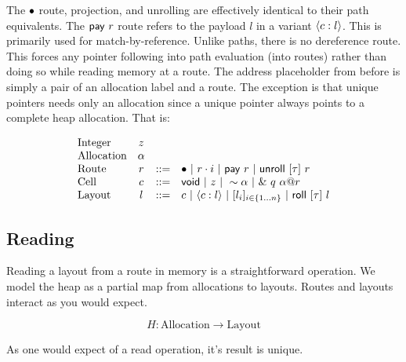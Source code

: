 The $\bullet$ route, projection, and unrolling are effectively identical to their path equivalents.
The $\mathsf{pay}~{r}$ route refers to the payload $l$ in a variant $\langle{{c}:{l}}\rangle$.
This is primarily used for match-by-reference.
Unlike paths, there is no dereference route.
This forces any pointer following into path evaluation (into routes)
rather than doing so while reading memory at a route.
The address placeholder from before is simply a pair of an allocation label and a route.
The exception is that unique pointers needs only an allocation since a unique pointer
always points to a complete heap allocation.
That is:

\[
\begin{array}{lccl}
\textrm{Integer} & z & & \\
\textrm{Allocation} & \alpha & & \\
\textrm{Route} & r & ::= & \bullet ~|~ {r}\cdot{i} ~|~ \mathsf{pay}~{r} ~|~ \mathsf{unroll}~[{\tau}]~{r} \\
\textrm{Cell} & c & ::= & \mathsf{void} ~|~ z ~|~ 
			      \sim{\alpha} ~|~ \&~{{q}~{{\alpha}@{r}}} \\
\textrm{Layout} & l & ::= & c ~|~ \langle{{c}:{l}}\rangle ~|~ 
			       [{{l}_{i}}]_{{i} \in \{1 \ldots {n}\} } ~|~ \mathsf{roll}~[{\tau}]~{l} \\
\end{array}
\]

\subsection*{Reading}

Reading a layout from a route in memory is a straightforward operation.
We model the heap as a partial map from allocations to layouts.
Routes and layouts interact as you would expect.

$$ H : \mathrm{Allocation} \to \mathrm{Layout} $$



As one would expect of a read operation, it's result is unique.

